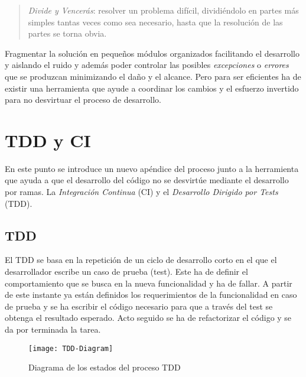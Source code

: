 \begin{quote}
    \emph{Divide y Vencerás}: resolver un problema difícil, dividiéndolo en partes más simples tantas veces como sea necesario, hasta que la resolución de las partes se torna obvia.
\end{quote}

\par Fragmentar la solución en pequeños módulos organizados facilitando el desarrollo y aislando el ruido y además poder controlar las posibles \emph{excepciones} o \emph{errores} que se produzcan minimizando el daño y el alcance. Pero para ser eficientes ha de existir una herramienta que ayude a coordinar los cambios y el esfuerzo invertido para no desvirtuar el proceso de desarrollo.



\section{TDD y CI}
\label{sec:tdd-ci}

\par En este punto se introduce un nuevo apéndice del proceso junto a la herramienta que ayuda a que el desarrollo del código no se desvirtúe mediante el desarrollo por ramas. La \emph{Integración Continua} (CI) y el \emph{Desarrollo Dirigido por Tests} (TDD).

\subsection{TDD}
\label{sub:tdd}

\par El TDD se basa en la repetición de un ciclo de desarrollo corto en el que el desarrollador escribe un caso de prueba (test). Este ha de definir el comportamiento que se busca en la nueva funcionalidad y ha de fallar. A partir de este instante ya están definidos los requerimientos de la funcionalidad en caso de prueba y se ha escribir el código necesario para que a través del test se obtenga el resultado esperado. Acto seguido se ha de refactorizar el código y se da por terminada la tarea.

\begin{figure}[H]
    \centering
    \texttt{[image: TDD-Diagram]}
    \caption{Diagrama de los estados del proceso TDD}
    \label{fig:TDD-Diagram}
\end{figure}

